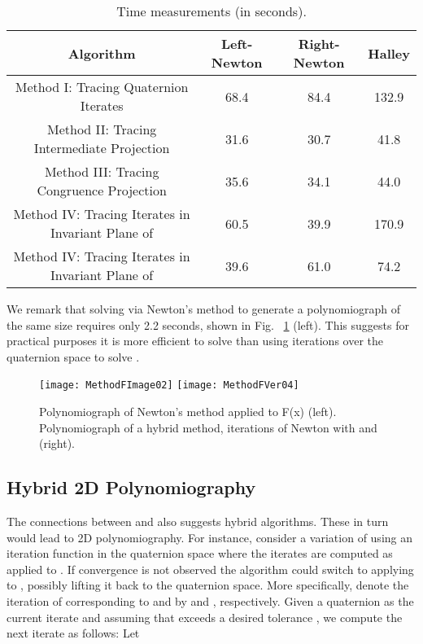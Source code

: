 \documentclass{article}
\theoremstyle{definition}
\begin{document}
\begin{table}
\begin{center}
\begin{tabular}{|c|c|c|c|}
\hline
{} Algorithm &Left-Newton & Right-Newton & Halley\\
\hline
 Method I: Tracing Quaternion Iterates & 68.4 & 84.4 & 132.9\\
Method II: Tracing Intermediate Projection & 31.6 & 30.7 & 41.8\\
Method III: Tracing Congruence Projection & 35.6 & 34.1 & 44.0\\
Method IV: Tracing Iterates in Invariant Plane  of  & 60.5 & 39.9 & 170.9\\
Method IV: Tracing Iterates in Invariant Plane  of  & 39.6 & 61.0 & 74.2 \\
\hline
\end{tabular}
\caption{Time measurements (in seconds).}
\label{TimeMeasurement}
\end{center}
\end{table}

We remark that solving  via Newton's method to generate a polynomiograph of the same size requires only 2.2 seconds, shown in Fig.~ \ref{FigF} (left).   This suggests for practical purposes it is more efficient to solve  than using iterations over the quaternion space to solve .

\begin{figure}
\begin{center}
\texttt{[image: MethodFImage02]}
\texttt{[image: MethodFVer04]}
\caption{Polynomiograph of Newton's method applied to F(x) (left).
Polynomiograph of a hybrid method, iterations of Newton with  and  (right).}
\label{FigF}
\end{center}
\end{figure}

\subsection{Hybrid 2D Polynomiography}
The connections between  and   also suggests hybrid algorithms. These in turn would lead to 2D polynomiography. For instance, consider a variation of using an iteration function 
in the quaternion space where the iterates are computed as applied to . If convergence
is not observed the algorithm could switch to applying 
to , possibly lifting it back to the quaternion space. More specifically,
denote the iteration of   corresponding to  and
 by  and , respectively. Given a quaternion
 as the current iterate and assuming that 
exceeds a desired tolerance , we compute the next iterate
 as follows: Let
\end{document}
